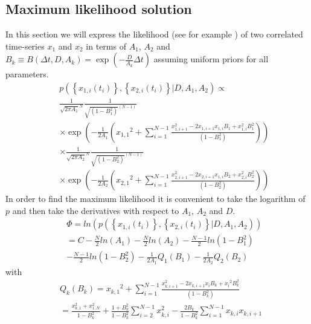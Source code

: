 \documentclass[%
 reprint,
 amsmath,amssymb,
 aps,
]{revtex4-1}
\begin{document}
\subsection{Maximum likelihood solution}
In this section we will express the likelihood (see for example \cite{RN42}) of two correlated time-series $x_1$ and $x_2$ in terms of $A_{1}$, $A_{2}$ and $B_{k}\equiv B(\Delta t,D,A_{k})=\exp\left(-\frac{D}{A_{k}}\Delta t\right)$ assuming uniform priors for all parameters.
\begin{eqnarray}
	&&p\left( \left\{x_{1,i}(t_i)\right\},\left\{x_{2,i}(t_i)\right\} \left| D, A_{1},A_{2} \right.\right) \propto \\
	&&\frac{1}{\sqrt {2 \pi A_{1}}^{N} }
	\frac{1}{{\sqrt {(1-B_{1}^{2})}^{(N-1)} }}\nonumber\\
	&&\times\exp \left( -\frac{1}{2A_{1}}\left( {x_{1,1}}^{2} + 
	\sum\limits_{i=1}^{N-1}\frac{ x_{1,i+1}^{2} - 2x_{1,i+1}x_{1,i}B_{1} +x_{1,i}^{2}B_{1}^{2} }{(1-B_{1}^{2})} \right)\right)\nonumber\\
	&&\times\frac{1}{\sqrt {2 \pi A_{2}}^{N} }
	\frac{1}{{\sqrt {(1-B_{2}^{2})}^{(N-1)} }}\nonumber\\
	&&\times\exp \left( -\frac{1}{2A_{2}}\left( {x_{2,1}}^{2} + 
	\sum\limits_{i=1}^{N-1}\frac{ x_{2,i+1}^{2} - 2x_{2,i+1}x_{1,i}B_{2} +x_{2,i}^{2}B_{2}^{2} }{(1-B_{2}^{2})} \right)\right)\nonumber
\end{eqnarray}
In order to find the maximum likelihood it is convenient to take the logarithm of $p$ and then take the derivatives with respect to $A_{1}$, $A_{2}$ and $D$.
\begin{eqnarray}
	&&\Phi = ln \left( p\left( \left\{x_{1,i}(t_i)\right\},\left\{x_{2,i}(t_i)\right\} \left|  D, A_{1},A_{2} \right.\right) \right)\\
	&&= C - \frac{N}{2} ln(A_{1}) - \frac{N}{2} ln(A_{2})- \frac{N-1}{2}ln \left( 1-B_{1}^{2}\right) \nonumber\\
	&&- \frac{N-1}{2}ln \left( 1-B_{2}^{2}\right) -\frac{1}{2A_{1}}Q_{1}(B_{1})-\frac{1}{2A_{2}}Q_{2}(B_{2})\nonumber
\end{eqnarray}
with\begin{equation}
	\begin{aligned}
	&Q_{k}(B_{k}) = {x_{k,1}}^{2} + \sum\limits_{i=1}^{N-1}\frac{ {x_{k,i+1}^{2} - 2x_{k,i+1}{x_i}B_{k}} +{x_i}^{2}B_{k}^{2} }{(1-B_{k}^{2})}\\
	&= \frac{x_{k,1}^{2}+x_{1,N}^{2}}{1-B_{k}^2}+\frac{1+B_{k}^2}{1-B_{k}^2}\sum\limits_{i=2}^{N-1}x_{k,i}^{2}-\frac{2B_{k}}{1-B_{k}^2}\sum\limits_{i=1}^{N-1}x_{k,i}x_{k,i+1}
	\end{aligned}
\end{equation}
\end{document}
